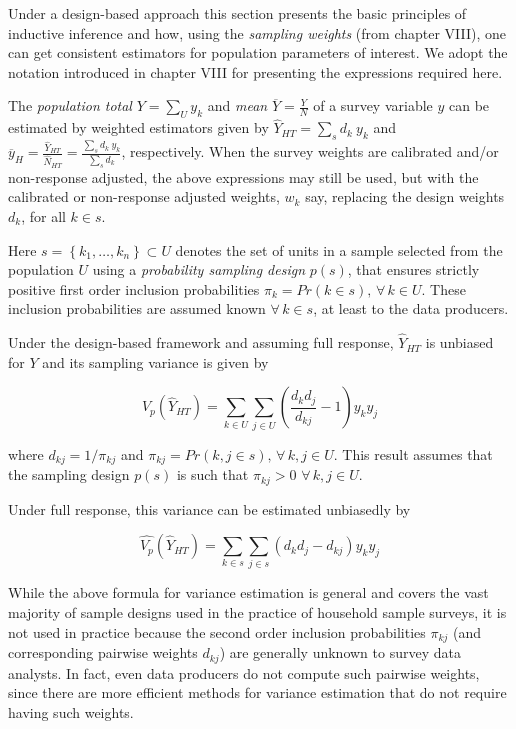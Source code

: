 \documentclass[
  12pt,
]{book}
\begin{document}
Under a design-based approach this section presents the basic principles of inductive inference and how, using the \emph{sampling weights} (from chapter VIII), one can get consistent estimators for population parameters of interest. We adopt the notation introduced in chapter VIII for presenting the expressions required here.

The \emph{population total} \(Y = \sum _{U} y_k\) and \emph{mean} \(\overline Y = \frac Y N\) of a survey variable \(y\) can be estimated by weighted estimators given by \(\widehat Y _{HT} = \sum _{s} d_k \ y_k\) and \(\overline y_{H} = \frac {\widehat Y_{HT}} {\widehat N_{HT}} = \frac {\sum_{s} d_k \ y_k} {\sum_{s} d_k}\), respectively. When the survey weights are calibrated and/or non-response adjusted, the above expressions may still be used, but with the calibrated or non-response adjusted weights, \(w_k\) say, replacing the design weights \(d_k\), for all \(k \in s\).

Here \(s = \left\{ k_1, \ldots, k_n \right\} \subset U\) denotes the set of units in a sample selected from the population \(U\) using a \emph{probability sampling design} \(p(s)\), that ensures strictly positive first order inclusion probabilities \(\pi_k = Pr(k \in s), \, \forall \, k \in U\). These inclusion probabilities are assumed known \(\forall \, k \in s\), at least to the data producers.

Under the design-based framework and assuming full response, \(\widehat Y _{HT}\) is unbiased for \(Y\) and its sampling variance is given by

\[
V_p \left( \widehat{Y}_{HT} \right) = \sum_{k \in U} \sum_{j \in U} \left( \frac {d_k d_j} {d_{kj}} - 1 \right) y_k y_j
\]

where \(d_{kj} = 1 / \pi_{kj}\) and \(\pi_{kj} = Pr(k,j \in s), \, \forall \, k,j \in U\). This result assumes that the sampling design \(p(s)\) is such that \(\pi_{kj} > 0 \,\, \forall \, k,j \in U\).

Under full response, this variance can be estimated unbiasedly by

\[
\widehat {V_p} \left( \widehat{Y}_{HT} \right) = \sum_{k \in s} \sum_{j \in s} \left( d_k d_j - d_{kj} \right) y_k y_j
\]

While the above formula for variance estimation is general and covers the vast majority of sample designs used in the practice of household sample surveys, it is not used in practice because the second order inclusion probabilities \(\pi_{kj}\) (and corresponding pairwise weights \(d_{kj}\)) are generally unknown to survey data analysts. In fact, even data producers do not compute such pairwise weights, since there are more efficient methods for variance estimation that do not require having such weights.
\end{document}
